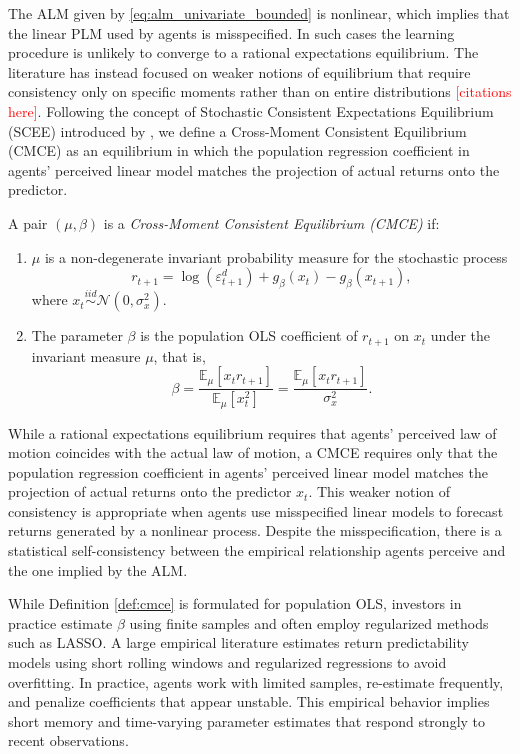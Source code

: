 \documentclass[11pt]{article}
\begin{document}
The ALM given by \eqref{eq:alm_univariate_bounded} is nonlinear, which implies that the linear PLM used by agents is misspecified. In such cases the learning procedure is unlikely to converge to a rational expectations equilibrium. The literature has instead focused on weaker notions of equilibrium that require consistency only on specific moments rather than on entire distributions \textcolor{red}{[citations here]}. Following the concept of Stochastic Consistent Expectations Equilibrium (SCEE) introduced by \cite{Hommes2013}, we define a Cross-Moment Consistent Equilibrium (CMCE) as an equilibrium in which the population regression coefficient in agents' perceived linear model matches the projection of actual returns onto the predictor.

\begin{definition}\label{def:cmce}
A pair $(\mu,\beta)$ is a \emph{Cross-Moment Consistent Equilibrium (CMCE)} if:
\begin{enumerate}
    \item $\mu$ is a non-degenerate invariant probability measure for the 
    stochastic process
    \[
        r_{t+1}
        = \log(\varepsilon^d_{t+1})
        + g_{\beta}(x_t)
        - g_{\beta}(x_{t+1}),
    \]
    where $x_t \stackrel{iid}{\sim} \mathcal{N}(0, \sigma^2_x)$.
    
    \item The parameter $\beta$ is the population OLS coefficient of $r_{t+1}$ 
    on $x_t$ under the invariant measure $\mu$, that is,
    \[
        \beta = \frac{\mathbb{E}_\mu[x_t r_{t+1}]}{\mathbb{E}_\mu[x_t^2]} 
        = \frac{\mathbb{E}_\mu[x_t r_{t+1}]}{\sigma^2_x}.
    \]
\end{enumerate}
\end{definition}

While a rational expectations equilibrium requires that agents' perceived law of motion coincides with the actual law of motion, a CMCE requires only that the population regression coefficient in agents' perceived linear model matches the projection of actual returns onto the predictor $x_t$. This weaker notion of consistency is appropriate when agents use misspecified linear models to forecast returns generated by a nonlinear process. Despite the misspecification, there is a statistical self-consistency between the empirical relationship agents perceive and the one implied by the ALM.

While Definition \ref{def:cmce} is formulated for population OLS, investors in practice estimate $\beta$ using finite samples and often employ regularized methods such as LASSO. A large empirical literature estimates return predictability models using short rolling windows and regularized regressions to avoid overfitting. In practice, agents work with limited samples, re-estimate frequently, and penalize coefficients that appear unstable. This empirical behavior implies short memory and time-varying parameter estimates that respond strongly to recent observations.
\end{document}
